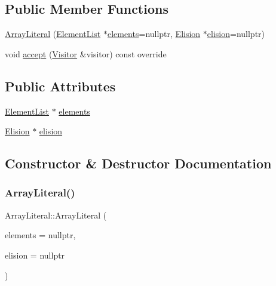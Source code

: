 \subsection*{Public Member Functions}
\begin{DoxyCompactItemize}
\item 
\hyperlink{struct_array_literal_a1df7283ca804e7c1147f5024e2e0408d}{Array\+Literal} (\hyperlink{struct_element_list}{Element\+List} $\ast$\hyperlink{struct_array_literal_ae4c3df364c3994cb8916d73a50f1f92f}{elements}=nullptr, \hyperlink{struct_elision}{Elision} $\ast$\hyperlink{struct_array_literal_a08fa9ad6e83376bb2a70d22df9cf2c8a}{elision}=nullptr)
\item 
void \hyperlink{struct_array_literal_ab3ba06d627e0fe714aafb9fc843c83e8}{accept} (\hyperlink{struct_visitor}{Visitor} \&visitor) const override
\end{DoxyCompactItemize}
\subsection*{Public Attributes}
\begin{DoxyCompactItemize}
\item 
\hyperlink{struct_element_list}{Element\+List} $\ast$ \hyperlink{struct_array_literal_ae4c3df364c3994cb8916d73a50f1f92f}{elements}
\item 
\hyperlink{struct_elision}{Elision} $\ast$ \hyperlink{struct_array_literal_a08fa9ad6e83376bb2a70d22df9cf2c8a}{elision}
\end{DoxyCompactItemize}


\subsection{Constructor \& Destructor Documentation}
\mbox{\label{struct_array_literal_a1df7283ca804e7c1147f5024e2e0408d}} 
\subsubsection{\texorpdfstring{Array\+Literal()}{ArrayLiteral()}}
{\footnotesize\ttfamily Array\+Literal\+::\+Array\+Literal (\begin{DoxyParamCaption}\item[{\hyperlink{struct_element_list}{Element\+List} $\ast$}]{elements = {\ttfamily nullptr},  }\item[{\hyperlink{struct_elision}{Elision} $\ast$}]{elision = {\ttfamily nullptr} }\end{DoxyParamCaption})\hspace{0.3cm}{\ttfamily [inline]}}



